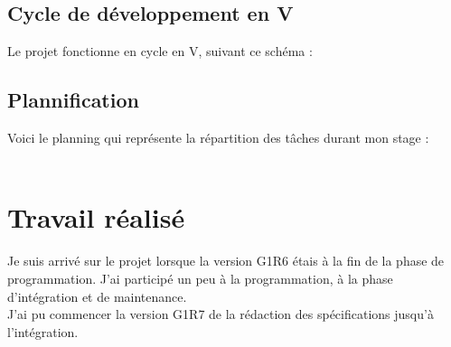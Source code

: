 \section{Cycle de développement en V}
Le projet fonctionne en cycle en V, suivant ce schéma :\\
\noindent%
\begin{minipage}{\linewidth}%
\label{visina8}%
\end{minipage}

\section{Plannification}
Voici le planning qui représente la répartition des tâches durant mon stage :\\\\
\noindent%
\begin{minipage}{\linewidth}%
\label{visina8}%
\end{minipage}
\chapter{Travail réalisé}
Je suis arrivé sur le projet lorsque la version G1R6 étais à la fin de la phase de programmation. J'ai participé un peu à la programmation, à la phase d'intégration et de maintenance.
\\J'ai pu commencer la version G1R7 de la rédaction des spécifications jusqu'à l'intégration.
